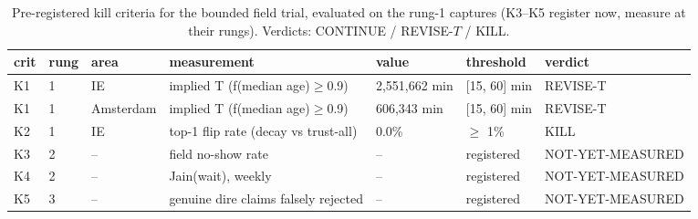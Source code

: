 \begin{table}
\centering\small
\caption{Pre-registered kill criteria for the bounded field trial,
evaluated on the rung-1 captures (K3--K5 register now, measure at
their rungs).  Verdicts: CONTINUE / REVISE-$T$ / KILL.}
\label{tab:trialkill}
\begin{tabular}{@{}lllllll@{}}
\toprule
crit & rung & area & measurement & value & threshold & verdict \\
\midrule
K1 & 1 & IE & implied T (f(median age)$\ge$0.9) & 2,551,662 min & [15, 60] min & REVISE-T \\
K1 & 1 & Amsterdam & implied T (f(median age)$\ge$0.9) & 606,343 min & [15, 60] min & REVISE-T \\
K2 & 1 & IE & top-1 flip rate (decay vs trust-all) & 0.0\% & $\ge$ 1\% & KILL \\
K3 & 2 & -- & field no-show rate & -- & registered & NOT-YET-MEASURED \\
K4 & 2 & -- & Jain(wait), weekly & -- & registered & NOT-YET-MEASURED \\
K5 & 3 & -- & genuine dire claims falsely rejected & -- & registered & NOT-YET-MEASURED \\
\bottomrule
\end{tabular}
\end{table}
